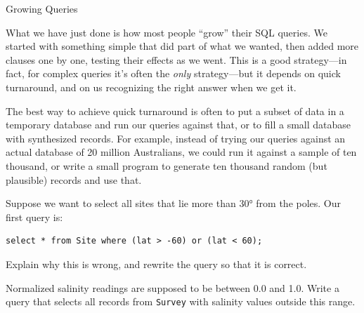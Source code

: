 \documentclass{book}
\begin{document}
\begin{swcbox}{Growing Queries}

What we have just done is how most people ``grow'' their SQL queries. We
started with something simple that did part of what we wanted, then
added more clauses one by one, testing their effects as we went. This is
a good strategy---in fact, for complex queries it's often the
\emph{only} strategy---but it depends on quick turnaround, and on us
recognizing the right answer when we get it.

The best way to achieve quick turnaround is often to put a subset of
data in a temporary database and run our queries against that, or to
fill a small database with synthesized records. For example, instead of
trying our queries against an actual database of 20 million Australians,
we could run it against a sample of ten thousand, or write a small
program to generate ten thousand random (but plausible) records and use
that.

\end{swcbox}

\begin{challenge}
  Suppose we want to select all sites that lie more than 30° from the
  poles. Our first query is:

\begin{verbatim}
select * from Site where (lat > -60) or (lat < 60);
\end{verbatim}

  Explain why this is wrong, and rewrite the query so that it is
  correct.
\end{challenge}

\begin{challenge}
  Normalized salinity readings are supposed to be between 0.0 and 1.0.
  Write a query that selects all records from \texttt{Survey} with
  salinity values outside this range.
\end{challenge}
\end{document}
